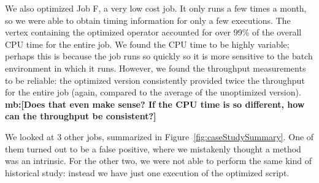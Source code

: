 We also optimized Job F, a very low cost job.
It only runs a few times a month, so we were able to obtain timing information for only a few executions.
The vertex containing the optimized operator accounted for over 99\% of the overall CPU time for the entire job.
We found the CPU time to be highly variable; perhaps this is because the job runs so quickly so it is more sensitive to the batch environment in which it runs.
However,  we found the throughput measurements to be reliable: the optimized version consistently provided twice the throughput for the entire job (again, compared to the average of the unoptimized version).
{\bf mb:[Does that even make sense? If the CPU time is so different, how can the throughput be consistent?]}

We looked at 3 other jobs, summarized in Figure~\ref{fig:caseStudySummary}.
One of them turned out to be a false positive, where we mistakenly thought a method was an intrinsic.
For the other two, we were not able to perform the same kind of historical study: instead we have just one execution of the optimized script.


